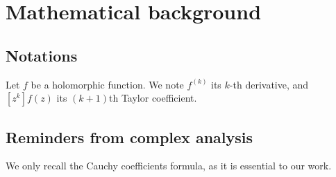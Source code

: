 \documentclass[../main.tex]{subfiles}
\begin{document}
\chapter{Mathematical background}

\section{Notations}

\begin{definition}{}
	Let $f$ be a holomorphic function. We note $f^{(k)}$ its $k$-th derivative, and $[z^k]f(z)$ its $(k+1)$th Taylor coefficient.
\end{definition}

%		
%		

\section{Reminders from complex analysis}

We only recall the Cauchy coefficients formula, as it is essential to our work.

%
%
%
%	
%	
%	
\end{document}
